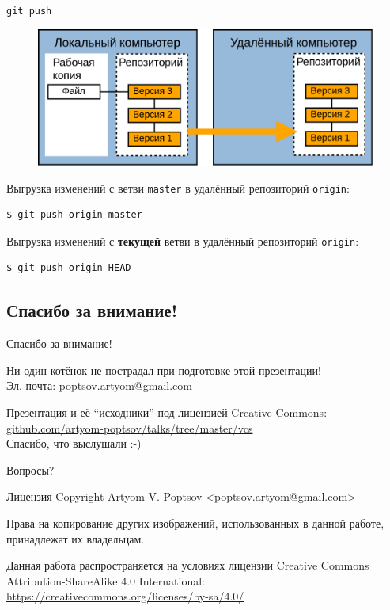 \documentclass[presentation]{beamer}
\begin{document}

\begin{frame}[fragile]{\texttt{git push}}
  \begin{figure}[htb]
    \centering
    \includegraphics[width=.6\textwidth]{git-operation-push}
  \end{figure}
  Выгрузка изменений с ветви \texttt{master} в удалённый репозиторий
  \texttt{origin}:
\begin{verbatim}
$ git push origin master
\end{verbatim}

  Выгрузка изменений с \textbf{текущей} ветви в удалённый репозиторий
  \texttt{origin}:
\begin{verbatim}
$ git push origin HEAD
\end{verbatim}
\end{frame}



\subsection{Спасибо за внимание!}

\begin{frame}{Спасибо за внимание!}
  \large

  \raisebox{-.30em}{\Large\HandRight}\hspace{.25em} Ни один котёнок не
  пострадал при подготовке этой презентации! \\[30pt]

  Эл. почта: \url{poptsov.artyom@gmail.com}

  \medskip

  Презентация и её ``исходники'' под лицензией Creative Commons:
  \url{github.com/artyom-poptsov/talks/tree/master/vcs} \\[10pt]

  Спасибо, что выслушали  :-) \\[30pt]

  \bigskip

  \huge Вопросы?
\end{frame}

\begin{frame}{Лицензия}
  Copyright  Artyom V. Poptsov
  <poptsov.artyom@gmail.com> \newline

  Права на копирование других изображений, использованных в данной
  работе, принадлежат их владельцам. \newline

  Данная работа распространяется на условиях лицензии Creative Commons
  Attribution-ShareAlike 4.0 International:
  \url{https://creativecommons.org/licenses/by-sa/4.0/}
\end{frame}
\end{document}

